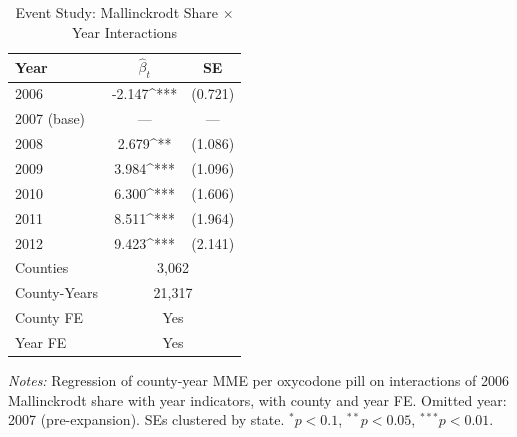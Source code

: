 \begin{table}[htbp]
\centering
\caption{Event Study: Mallinckrodt Share $\times$ Year Interactions}
\label{tab:eventstudy}
\begin{tabular}{lcc}
\hline\hline
Year & $\hat{\beta}_t$ & SE \\
\hline
2006 & -2.147^{***} & (0.721) \\
2007 (base) & --- & --- \\
2008 & 2.679^{**} & (1.086) \\
2009 & 3.984^{***} & (1.096) \\
2010 & 6.300^{***} & (1.606) \\
2011 & 8.511^{***} & (1.964) \\
2012 & 9.423^{***} & (2.141) \\
\hline
Counties & \multicolumn{2}{c}{3,062} \\
County-Years & \multicolumn{2}{c}{21,317} \\
County FE & \multicolumn{2}{c}{Yes} \\
Year FE & \multicolumn{2}{c}{Yes} \\
\hline\hline
\end{tabular}
\par\vspace{0.5em}\parbox{\textwidth}{\small \textit{Notes:} Regression of county-year MME per oxycodone pill on interactions of 2006 Mallinckrodt share with year indicators, with county and year FE. Omitted year: 2007 (pre-expansion). SEs clustered by state. $^{*}p<0.1$, $^{**}p<0.05$, $^{***}p<0.01$.
}
\end{table}
